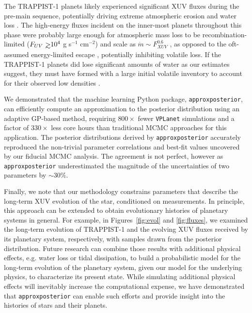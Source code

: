 \documentclass[twocolumn]{aastex62}
\def\gsim{~\rlap{$>$}{\lower 1.0ex\hbox{$\sim$}}}
\newcommand{\vplanet}[0]{\texttt{VPLanet}\xspace}
\newcommand{\approxposterior}[0]{\texttt{approxposterior}\xspace}
\begin{document}
The TRAPPIST-1 planets likely experienced significant XUV fluxes during the pre-main sequence, potentially driving extreme atmospheric erosion and water loss \citep{Bolmont2017,Bourrier2017a}. The high-energy fluxes incident on the inner-most planets throughout this phase were probably large enough for atmospheric mass loss to be recombination-limited ($F_{UV} \gsim 10^4$ g s$^{-1}$ cm$^{-2}$) and scale as $\dot{m} \sim F_{XUV}^{0.6}$ \citep{MurrayClay2009}, as opposed to the oft-assumed energy-limited escape \citep[$\dot{m} \sim F_{XUV}$,][]{Watson1981,Lammer2003}, potentially inhibiting volatile loss. If the TRAPPIST-1 planets did lose significant amounts of water as our estimates suggest, they must have formed with a large initial volatile inventory to account for their observed low densities \citep{Grimm2018}.

We demonstrated that the machine learning Python package, \approxposterior \citep{FlemingVanderPlas2018}, can efficiently compute an approximation to the posterior distribution using an adaptive GP-based method, requiring $800\times$ fewer \vplanet simulations and a factor of $330\times$ less core hours than traditional MCMC approaches for this application. The posterior distributions derived by \approxposterior accurately reproduced the non-trivial parameter correlations and best-fit values uncovered by our fiducial MCMC analysis. The agreement is not perfect, however as \approxposterior underestimated the magnitude of the uncertainties of two parameters by ${\sim}30\%$.  

Finally, we note that our methodology constrains parameters that describe the long-term XUV evolution of the star, conditioned on measurements. In principle, this approach can be extended to obtain evolutionary histories of planetary systems in general.  For example, in Figures~\ref{fig:evol} and \ref{fig:fluxes}, we examined the long-term evolution of TRAPPIST-1 and the evolving XUV fluxes received by its planetary system, respectively, with samples drawn from the posterior distribution. Future research can combine those results with additional physical effects, e.g. water loss or tidal dissipation, to build a probabilistic model for the long-term evolution of the planetary system, given our model for the underlying physics, to characterize its present state. While simulating additional physical effects will inevitably increase the computational expense, we have demonstrated that \approxposterior can enable such efforts and provide insight into the histories of stars and their planets.
\end{document}

